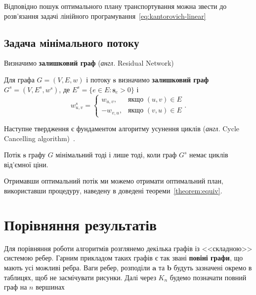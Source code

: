 Відповідно пошук оптимального плану транспортування можна звести до розв'язання задачі лінійного
програмування~\ref{eq:kantorovich-linear}

\subsection{Задача мінімального потоку}

Визначимо \textbf{залишковий граф} (\textit{англ.} Residual Network)
\begin{definition}
    Для графа $G = (V, E, w)$ і потоку $\mathbf{s}$ визначимо \textbf{залишковий граф} $G^s = (V, E^s, w^s)$, де
    $E^s = \{e \in E : \mathbf{s}_e > 0\}$ і 
    $$
        w^s_{u, v} = \begin{cases}
            w_{u, v}, &\text{якщо }(u, v) \in E \\
            -w_{v, u}, &\text{якщо }(v, u) \in E
        \end{cases}.
    $$
\end{definition}

Наступне твердження є фундаментом алгоритму усунення циклів
(\textit{англ.} Cycle Cancelling algorithm)~\cite{cycle}.

\begin{theorem}
    Потік $\mathbf{s}$ графу $G$ мінімальний тоді і лише тоді, коли граф $G^s$ немає циклів від'ємної ціни.
\end{theorem}

Отримавши оптимальний потік ми можемо отримати оптимальний план, використавши процедуру,
наведену в доведені теореми~\ref{theorem:equiv}.

\section{Порівняння результатів}
Для порівняння роботи алгоритмів розглянемо декілька графів із <<складною>> системою ребер. Гарним прикладом таких графів
є так звані \textbf{повіні графи}, що мають усі можливі ребра. Ваги ребер, розподіли $\mathbf{a}$ та $\mathbf{b}$
будуть зазначені окремо в таблицях, щоб не засмічувати рисунки. Далі через $K_n$ будемо позначати повний граф на
$n$ вершинах

